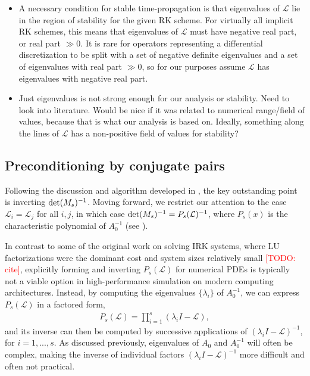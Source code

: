 \documentclass[review]{siamart}
\makeatletter
\newcommand{\todo}[1]{\textcolor{red}{[TODO\@: #1]}}
\makeatother
\begin{document}
{\color{blue}
\begin{itemize}

\item A necessary condition for stable time-propagation is that eigenvalues of $\mathcal{L}$
lie in the region of stability for the given RK scheme. For virtually all implicit RK schemes,
this means that eigenvalues of $\mathcal{L}$ must have negative real part, or real part
$\gg 0$. It is rare for operators representing a differential discretization to be split
with a set of negative definite eigenvalues and a set of eigenvalues with real part $\gg 0$,
so for our purposes assume $\mathcal{L}$ has eigenvalues with negative real part.

\item Just eigenvalues is not strong enough for our analysis or stability. Need to look
into literature. Would be nice if it was related to numerical range/field of values, because
that is what our analysis is based on. Ideally, something along the lines of $\mathcal{L}$ 
has a non-positive field of values for stability? 
\end{itemize}
}


\subsection{Preconditioning by conjugate pairs}

Following the discussion and algorithm developed in , the key
outstanding point is inverting $\textnormal{det}({M}_s)^{-1}$. Moving forward, we
restrict our attention to the case $\mathcal{L}_i = \mathcal{L}_j$ for all $i,j$,
in which case $\textnormal{det}({M}_s)^{-1} = P_s(\mathcal{L})^{-1}$, where
$P_s(x)$ is the characteristic polynomial of $A_0^{-1}$ (see ).

In contrast to some of the original work on solving IRK systems, where LU factorizations
were the dominant cost and system sizes relatively small \todo{cite}, explicitly forming and inverting
$P_s(\mathcal{L})$ for numerical PDEs is typically not a viable option in high-performance
simulation on modern computing architectures. Instead, by computing the eigenvalues
$\{\lambda_i\}$ of $A_0^{-1}$, we can express $P_s(\mathcal{L})$ in a factored form, 
%
\begin{align}\label{eq:fac}
P_s(\mathcal{L}) = \prod_{i=1}^s (\lambda_i I - \mathcal{L}),
\end{align}
%
and its inverse can then be computed by successive applications of $(\lambda_iI - \mathcal{L})^{-1}$,
for $i=1,...,s$. As discussed previously, eigenvalues of $A_0$ and $A_0^{-1}$ will often be
complex, making the inverse of individual factors $(\lambda_iI - \mathcal{L})^{-1}$ more
difficult and often not practical. 
\end{document}
